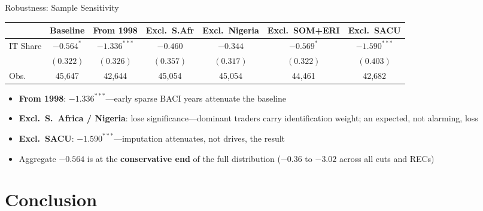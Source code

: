 \documentclass[aspectratio=169,11pt]{beamer}
\begin{document}
\begin{frame}{Robustness: Sample Sensitivity}

    {\small
    \begin{tabular}{lcccccc}
        \toprule
        & Baseline & From 1998 & Excl.\ S.Afr & Excl.\ Nigeria & Excl.\ SOM+ERI & Excl.\ SACU \\
        \midrule
        IT Share & $-0.564^{*}$ & $-1.336^{***}$ & $-0.460$ & $-0.344$ & $-0.569^{*}$ & $-1.590^{***}$ \\
                 & $(0.322)$    & $(0.326)$      & $(0.357)$ & $(0.317)$ & $(0.322)$    & $(0.403)$ \\
        \midrule
        Obs. & 45,647 & 42,644 & 45,054 & 45,054 & 44,461 & 42,682 \\
        \bottomrule
    \end{tabular}}

    \medskip

    \begin{itemize}
        \item \textbf{From 1998}: $-1.336^{***}$---early sparse BACI years attenuate the baseline
        \item \textbf{Excl.\ S.\ Africa / Nigeria}: lose significance---dominant traders carry
              identification weight; an expected, not alarming, loss
        \item \textbf{Excl.\ SACU}: $-1.590^{***}$---\alert{imputation attenuates, not drives, the result}
        \item Aggregate $-0.564$ is at the \textbf{conservative end} of the full distribution
              ($-0.36$ to $-3.02$ across all cuts and RECs)
    \end{itemize}

\end{frame}

\section{Conclusion}
\end{document}
